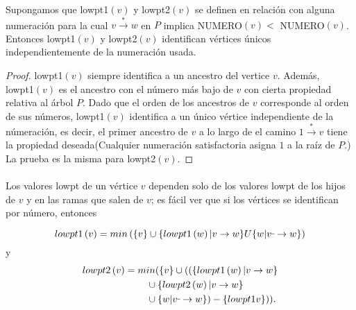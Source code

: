 \begin{lemma}
Supongamos que lowpt1$\left(v\right)$ y lowpt2$\left(v\right)$ se definen en relación con alguna numeración para la cual $v \overset{\ast}{\rightarrow} w$ en $P$ implica NUMERO$\left(v\right) < $ NUMERO$\left(v\right)$. Entonces lowpt1$\left(v\right)$ y lowpt2$\left(v\right)$ identifican vértices únicos independientemente de la numeración usada.
\label{lema:3.6}
\end{lemma}

\begin{proof}
lowpt1$\left(v\right)$ siempre identifica a un ancestro del vertice $v$. Además,\\ lowpt1$\left(v\right)$ es el ancestro con el número más bajo de $v$ con cierta propiedad relativa al árbol $P$. Dado que el orden de los ancestros de $v$ corresponde al orden de sus números, lowpt1$\left(v\right)$ identifica a un único vértice independiente de la númeración, es decir, el primer ancestro de $v$ a lo largo de el camino  $1 \overset{\ast}{\rightarrow} v$ tiene la propiedad deseada(Cualquier numeración satisfactoria asigna $1$ a la raíz de $P$.) La prueba es la misma para lowpt2$\left(v\right)$.
\end{proof}

\paragraph{}
Los valores lowpt de un vértice $v$ dependen solo de los valores lowpt de los hijos de $v$ y en las ramas que salen de $v$; es fácil ver que si los vértices se identifican por número, entonces

\begin{equation*}
lowpt1\left(v\right)= min\left(\{v\} \cup \{lowpt1\left(w\right)| v \rightarrow w\} U \{w| v \rule[1mm]{.1cm}{0.4pt} \rightarrow w\}\right)
\end{equation*}
y
\begin{equation*}
\begin{split}
lowpt2\left(v\right) &=  min(\{v\} \cup ((\{lowpt1\left(w\right)| v \rightarrow w\}\\ 
				   & 	\hspace{0.8cm} \cup \{lowpt2\left(w\right)| v \rightarrow w\} \\
				   &	\hspace{0.8cm} \cup \{w | v \rule[1mm]{.1cm}{0.4pt} \rightarrow  w\}) \newline - \{lowpt1v\})).
\end{split}
\end{equation*}

